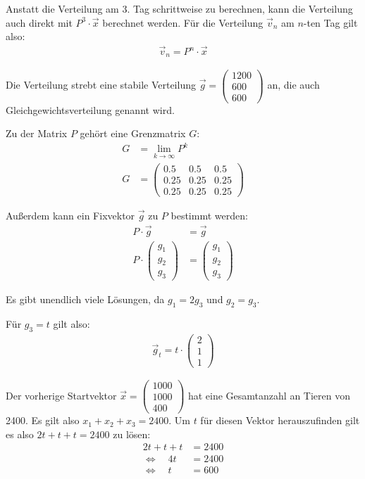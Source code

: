 \begin{flushleft}
Anstatt die Verteilung am 3. Tag schrittweise zu berechnen, kann die Verteilung auch direkt mit $P^3\cdot\vec{x}$ berechnet werden.
Für die Verteilung $\vec{v}_n$ am $n$-ten Tag gilt also:
\begin{align}
    \vec{v}_n=P^n\cdot\vec{x}
\end{align}

Die Verteilung strebt eine stabile Verteilung $\vec{g}=\begin{pmatrix} 1200 \\ 600 \\ 600 \end{pmatrix}$ an, die auch Gleichgewichtsverteilung genannt wird.

Zu der Matrix $P$ gehört eine Grenzmatrix $G$:
\begin{align}
    G&=\lim_{k\to\infty} P^k \\
    G&=\begin{pmatrix}
        0.5 & 0.5 & 0.5 \\
        0.25 & 0.25 & 0.25 \\
        0.25 & 0.25 & 0.25
    \end{pmatrix}
\end{align}

Außerdem kann ein Fixvektor $\vec{g}$ zu $P$ bestimmt werden:
\begin{align}
    P\cdot\vec{g}&=\vec{g} \\
    P\cdot\begin{pmatrix} g_1 \\ g_2 \\ g_3 \end{pmatrix}&=\begin{pmatrix} g_1 \\ g_2 \\ g_3 \end{pmatrix}
\end{align}

Es gibt unendlich viele Lösungen, da $g_1=2g_3$ und $g_2=g_3$.

Für $g_3=t$ gilt also:
\begin{align}
    \vec{g}_t=t\cdot\begin{pmatrix} 2 \\ 1 \\ 1 \end{pmatrix}
\end{align}

Der vorherige Startvektor $\vec{x}=\begin{pmatrix} 1000 \\ 1000 \\ 400 \end{pmatrix}$ hat eine Gesamtanzahl an Tieren von 2400.
Es gilt also $x_1+x_2+x_3=2400$.
Um $t$ für diesen Vektor herauszufinden gilt es also $2t+t+t=2400$ zu lösen:
\begin{align}
    2t+t+t&=2400 \\
    \Leftrightarrow\quad 4t&=2400 \\
    \Leftrightarrow\quad t&=600
\end{align}


\end{flushleft}
